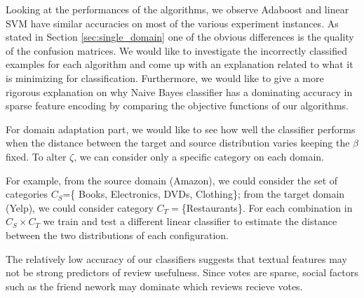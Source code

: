 \documentclass[letterpaper]{article}
\begin{document}
Looking at the performances of the algorithms, we observe Adaboost and
linear SVM have similar accuracies on most of the various experiment
instances. As stated in Section \ref{sec:single_domain} one of the
obvious differences is the quality of the confusion matrices. We would
like to investigate the incorrectly classified examples for each
algorithm and come up with an explanation related to what it is
minimizing for classification.  Furthermore, we would like to give a
more rigorous explanation on why Naive Bayes classifier has a
dominating accuracy in sparse feature encoding by comparing the
objective functions of our algorithms.

For domain adaptation part, we would like to see how well the
classifier performs when the distance between the target and source
distribution varies keeping the $\beta$ fixed. To alter $\zeta$, we
can consider only a specific category on each domain.

For example, from the source domain (Amazon), we could consider the
set of categories $C_S$=\{ Books, Electronics, DVDs, Clothing\};
from the target domain (Yelp), we could consider category
$C_T=$\{Restaurants\}. For each combination in $C_S\times C_T$ we
train and test a different linear classifier to estimate the distance
between the two distributions of each configuration.

The relatively low accuracy of our classifiers suggests that textual features
may not be strong predictors of review usefulness.  Since votes are sparse,
social factors such as the friend nework may dominate which reviews recieve
votes.  



\end{document}
